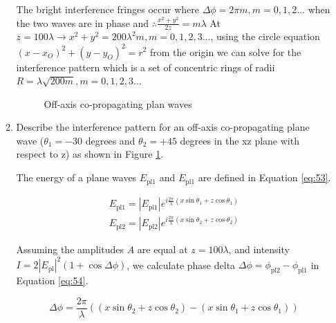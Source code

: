 \documentclass[main.tex]{subfiles}
\begin{document}
\begin{enumerate}
\begin{enumerate}
The bright interference fringes occur where $\Delta \phi=2 \pi m, m=0,1,2 \ldots$ when the two waves are in phase and $\therefore  \frac{x^{2}+y^{2}}{2 z}=m \lambda$  At $z=100 \lambda \rightarrow x^{2}+y^{2}=200 \lambda^{2} m, m=0,1,2,3 \ldots $, using the circle equation $(x-x_{O})^{2}+(y-y_{O})^{2}=r^2$ from the origin we can solve for the interference pattern which is a set of concentric rings of radii $R=\lambda \sqrt{200 m}, m=0,1,2,3 \ldots$

\begin{figure}
\centering{}
\caption{Off-axis co-propagating plan waves}
\label{fig:52}
\end{figure}

\item Describe the interference pattern for an off-axis co-propagating plane wave ($\theta_1 = -30$ degrees and $\theta_2 = +45$ degrees in the xz plane with respect to z) as shown in Figure \ref{fig:52}.

The energy of a plane waves $E_{\mathrm{pl1}}$ and $E_{\mathrm{pl1}}$ are defined in Equation \ref{eq:53}.

\begin{equation}\label{eq:53}
\begin{array}{l}
{E_{\mathrm{pl1}}=\left|E_{\mathrm{pl1}}\right| e^{i \frac{2 \pi}{\lambda}(x \sin \theta_1+z \cos \theta_1)}}\\
{E_{\mathrm{pl2}}=\left|E_{\mathrm{pl2}}\right| e^{i \frac{2 \pi}{\lambda}(x \sin \theta_2+z \cos \theta_2)}}
\end{array}
\end{equation}

Assuming the amplitudes $A$ are equal at $z=100\lambda$, and intensity $I=2\left|E_{\mathrm{pl}}\right|^{2}(1+\cos \Delta \phi)$, we calculate phase delta $\Delta \phi=\phi_{\mathrm{pl2}}-\phi_{\mathrm{pl1}}$ in Equation \ref{eq:54}.

\begin{equation}\label{eq:54}
\Delta \phi= \frac{2 \pi}{\lambda} \left((x \sin \theta_2+z \cos \theta_2) - (x \sin \theta_1+z \cos \theta_1) \right)
\end{equation}


\end{enumerate}
\end{enumerate}
\end{document}
